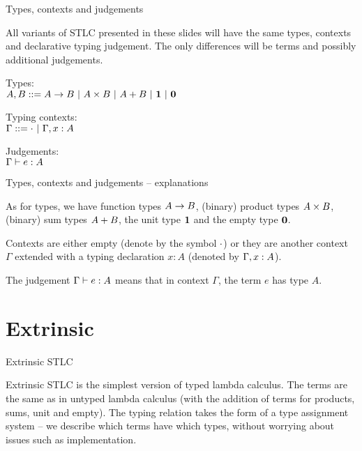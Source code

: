 \documentclass{beamer}
\begin{document}
\begin{frame}{Types, contexts and judgements}

All variants of STLC presented in these slides will have the same types, contexts and declarative typing judgement. The only differences will be terms and possibly additional judgements.

\vspace{2em}

Types: \\
$A, B ::= A \to B \ |\  A \times B \ |\  A + B \ |\  \textbf{1} \ |\  \textbf{0}$

\vspace{2em}

Typing contexts: \\
$\Gamma ::= \emptytypingctx \pipe \extend{\Gamma}{x}{A}$

\vspace{2em}

Judgements: \\
$\typing[\Gamma]{e}{A}$

\end{frame}

\begin{frame}{Types, contexts and judgements -- explanations}

As for types, we have function types $A \to B$, (binary) product types $A \times B$, (binary) sum types $A + B$, the unit type $\textbf{1}$ and the empty type $\textbf{0}$.

\vspace{2em}

Contexts are either empty (denote by the symbol $\cdot$) or they are another context $\Gamma$ extended with a typing declaration $x : A$ (denoted by $\extend{\Gamma}{x}{A}$).

\vspace{2em}

The judgement $\typing[\Gamma]{e}{A}$ means that in context $\Gamma$, the term $e$ has type $A$.

\end{frame}

\section{Extrinsic}

\begin{frame}{Extrinsic STLC}

Extrinsic STLC is the simplest version of typed lambda calculus. The terms are the same as in untyped lambda calculus (with the addition of terms for products, sums, unit and empty). The typing relation takes the form of a type assignment system -- we describe which terms have which types, without worrying about issues such as implementation.

\end{frame}
\end{document}
